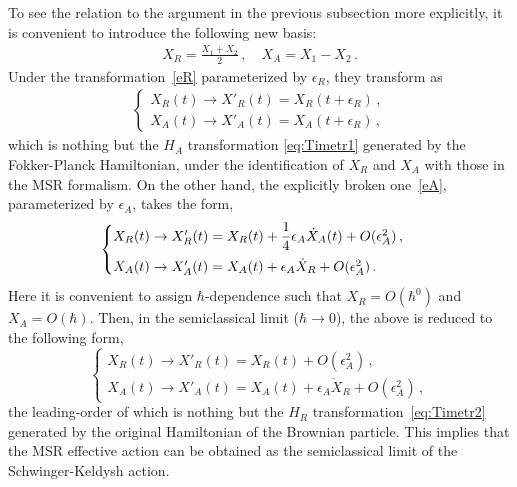 \documentclass[a4paper,11pt]{article}
\begin{document}
\medskip
To see the relation to the argument in the previous subsection more explicitly,
it is convenient to introduce the following new basis:
\begin{align}
 X_R = \frac{X_1 + X_2}{2}\,,
 \quad
 X_A= X_1 - X_2  \,.
\end{align}
Under the transformation~\eqref{eR} parameterized by $\epsilon_R$, they transform as
\begin{align}
 \begin{cases}
  X_R(t) \to X'_R (t) = X_R (t+\epsilon_R)\,, \\
  X_A(t) \to X'_A(t) = X_A (t+\epsilon_R)\,,
 \end{cases}
\end{align}
which is nothing but the $H_A$ transformation \eqref{eq:Timetr1} generated by 
the Fokker-Planck Hamiltonian, under the identification of 
$X_{R}$ and $X_A$ with those in the MSR formalism. 
On the other hand, the explicitly broken one~\eqref{eA}, parameterized by $\epsilon_A$, 
takes the form,
\begin{equation}
  \begin{cases}
   X_R(t) 
   \to X'_{R}(t) 
   = X_R(t)+ \dfrac{1}{4} \epsilon_A \dot{X}_A(t) + O (\epsilon_A^2) \,,
   \vspace{5pt} \\
   X_A(t) 
   \to X'_A(t) 
   = X_A(t) +\epsilon_A\dot{X}_R+ O (\epsilon_A^2)\,.
  \end{cases}
\end{equation}
Here it is convenient to assign $\hbar$-dependence such that 
$X_{R} =O (\hbar^0)$ and $X_A = O(\hbar)$. 
Then, in the semiclassical limit ($\hbar\to0$), 
the above is reduced to the following form,
\begin{equation}
 \begin{cases}
  X_R(t) \to 
  X'_R(t) = X_R(t) + O(\epsilon_A^2)\,,
  \\
  X_A(t)\to 
  X'_A(t) = X_A(t) + \epsilon_A \dot{X}_{R} + O(\epsilon_A^2)\,,
 \end{cases}
\end{equation}
the leading-order of which 
is nothing but the $H_R$ transformation~\eqref{eq:Timetr2}
generated by the original Hamiltonian of the Brownian particle.
This implies that the MSR effective action can be obtained 
as the semiclassical limit of the Schwinger-Keldysh action.
\medskip
\end{document}
